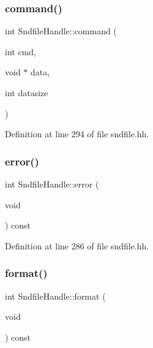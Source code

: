 \subsubsection{\texorpdfstring{command()}{command()}}
{\footnotesize\ttfamily int Sndfile\+Handle\+::command (\begin{DoxyParamCaption}\item[{int}]{cmd,  }\item[{void $\ast$}]{data,  }\item[{int}]{datasize }\end{DoxyParamCaption})\hspace{0.3cm}{\ttfamily [inline]}}



Definition at line 294 of file sndfile.\+hh.

\mbox{\label{class_sndfile_handle_a3918868973e847faad5427697a2ed610}} 
\subsubsection{\texorpdfstring{error()}{error()}}
{\footnotesize\ttfamily int Sndfile\+Handle\+::error (\begin{DoxyParamCaption}\item[{void}]{ }\end{DoxyParamCaption}) const\hspace{0.3cm}{\ttfamily [inline]}}



Definition at line 286 of file sndfile.\+hh.

\mbox{\label{class_sndfile_handle_a72b47b9aee449744817a2d6d702ab457}} 
\subsubsection{\texorpdfstring{format()}{format()}}
{\footnotesize\ttfamily int Sndfile\+Handle\+::format (\begin{DoxyParamCaption}\item[{void}]{ }\end{DoxyParamCaption}) const\hspace{0.3cm}{\ttfamily [inline]}}



